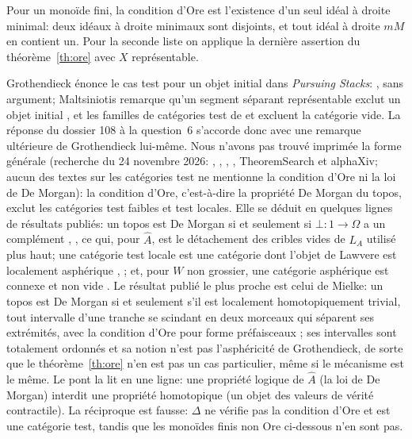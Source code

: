Pour un monoïde fini, la condition d'Ore est l'existence d'un seul idéal à droite minimal: deux idéaux à droite minimaux sont disjoints, et tout idéal à droite $mM$ en contient un. Pour la seconde liste on applique la dernière assertion du théorème~\ref{th:ore} avec $X$ représentable.

\status{} Grothendieck énonce le cas test pour un objet initial dans \emph{Pursuing Stacks}:  \cite[\S88, p.~294 du tapuscrit]{ps-arxiv}, sans argument; Maltsiniotis remarque qu'un segment séparant représentable exclut un objet initial \cite[rem.~6.8]{maltsiniotis-2001}, et les familles de catégories test de \cite[ex.~4.1.20]{cisinski-308} et \cite[ex.~6.9]{maltsiniotis-2001} excluent la catégorie vide. La réponse  du dossier 108 à la question~6 s'accorde donc avec une remarque ultérieure de Grothendieck lui-même. Nous n'avons pas trouvé imprimée la forme générale (recherche du 24 novembre 2026: \cite{cisinski-308}, \cite{maltsiniotis-301}, \cite{ps-arxiv}, \cite{hubert-thesis}, TheoremSearch et alphaXiv; aucun des textes sur les catégories test ne mentionne la condition d'Ore ni la loi de De Morgan): la condition d'Ore, c'est-à-dire la propriété De Morgan du topos, exclut les catégories test faibles et test locales. Elle se déduit en quelques lignes de résultats publiés: un topos est De Morgan si et seulement si $\bot\colon 1\to\Omega$ a un complément \cite[\S1]{caramello-demorgan}, \cite[prop.~6 (iii), prop.~14]{caramello-chamoun}, ce qui, pour $\widehat A$, est le détachement des cribles vides de $L_A$ utilisé plus haut; une catégorie test locale est une catégorie dont l'objet de Lawvere est localement asphérique \cite[th.~4.1.19]{cisinski-308}, \cite[th.~1.5.6]{maltsiniotis-301}; et, pour $W$ non grossier, une catégorie asphérique est connexe et non vide \cite[lemme~1.7.22]{maltsiniotis-301}. Le résultat publié le plus proche est celui de Mielke: un topos est De Morgan si et seulement s'il est localement homotopiquement trivial, tout intervalle d'une tranche se scindant en deux morceaux qui séparent ses extrémités, avec la condition d'Ore pour forme préfaisceaux \cite[th.~1.5, cor.~1.6]{mielke}; ses intervalles sont totalement ordonnés et sa notion n'est pas l'asphéricité de Grothendieck, de sorte que le théorème~\ref{th:ore} n'en est pas un cas particulier, même si le mécanisme est le même. Le pont la lit en une ligne: une propriété logique de $\widehat A$ (la loi de De Morgan) interdit une propriété homotopique (un objet des valeurs de vérité contractile). La réciproque est fausse: $\Delta$ ne vérifie pas la condition d'Ore et est une catégorie test, tandis que les monoïdes finis non Ore ci-dessous n'en sont pas.

